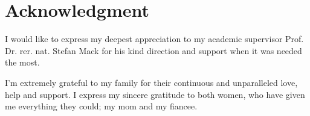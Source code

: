 
%
\chapter*{Acknowledgment}\label{chap:acknowledgment}


I would like to express my deepest appreciation to my academic supervisor Prof. Dr. rer. nat. Stefan Mack for his kind direction and support when it was needed the most.

I'm extremely grateful to my family for their continuous and unparalleled love, help and support. I express my sincere gratitude to both women, who have given me everything they could; my mom and my fiancee.